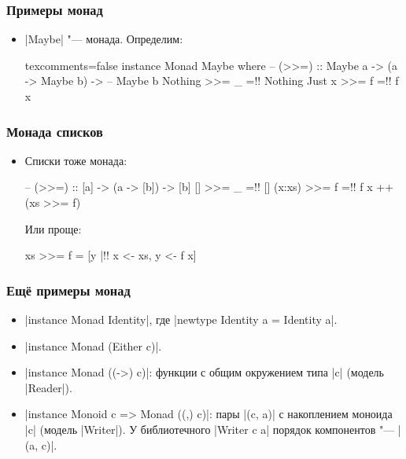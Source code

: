 \documentclass[11pt]{beamer}
\begin{document}
\begin{frame}[fragile]
  \frametitle{Примеры монад}
  \begin{itemize}
    \item \haskinline|Maybe| "--- монада. Определим:
          \begin{haskell*}{texcomments=false}
            instance Monad Maybe where
              -- (>>=) :: Maybe a -> (a -> Maybe b) ->
              --          Maybe b
              Nothing >>= _ =!\pause! Nothing
              Just x  >>= f =!\pause! f x
          \end{haskell*}
  \end{itemize}
\end{frame}

\begin{frame}[fragile]
  \frametitle{Монада списков}
  \begin{itemize}
    \item Списки тоже монада:
          \begin{haskell}
            -- (>{}>=) ::\pause{} [a] -> (a -> [b]) -> [b]
            []     >>= _ =!\pause! []
            (x:xs) >>= f =!\pause! f x ++ (xs >>= f)
          \end{haskell}
          Или проще:
          \begin{haskell}
            xs >>= f = [y |!\pause! x <- xs, y <- f x]
          \end{haskell}
  \end{itemize}
\end{frame}

\begin{frame}[fragile]
  \frametitle{Ещё примеры монад}
  \begin{itemize}
    \item \haskinline|instance Monad Identity|, где \haskinline|newtype Identity a = Identity a|.
    \item \haskinline|instance Monad (Either c)|.
    \item \haskinline|instance Monad ((->) c)|: функции с общим окружением типа \haskinline|c| (модель \haskinline|Reader|).
    \item \haskinline|instance Monoid c => Monad ((,) c)|: пары \haskinline|(c, a)| с накоплением моноида \haskinline|c| (модель \haskinline|Writer|). У библиотечного \haskinline|Writer c a| порядок компонентов "--- \haskinline|(a, c)|.
  \end{itemize}
\end{frame}
\end{document}
